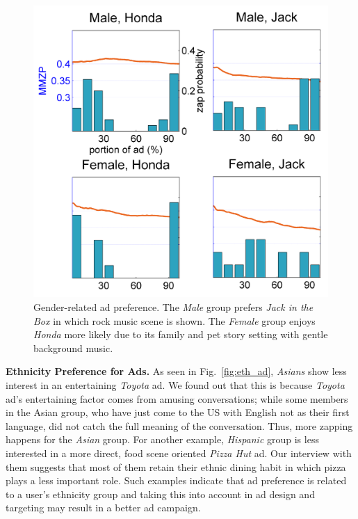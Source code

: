 \documentclass[twoside,leqno,twocolumn]{article}
\begin{document}
\begin{figure}[h]
	\centering
		\includegraphics[width=.8\columnwidth]{fig/ad_gend.png}
	\caption{Gender-related ad preference. The \textit{Male} group prefers \textit{Jack in the Box} in which rock music scene is shown. The \textit{Female} group enjoys \textit{Honda} more likely due to its family and pet story setting with gentle background music.}
	\label{fig:ad_gend}
\end{figure}

\noindent \textbf{Ethnicity Preference for Ads.} As seen in Fig.~\ref{fig:eth_ad}, \textit{Asians} show less interest in an entertaining \textit{Toyota} ad. We found out that this is because \textit{Toyota} ad's entertaining factor comes from amusing conversations; while some members in the Asian group, who have just come to the US with English not as their first language, did not catch the full meaning of the conversation. Thus, more zapping happens for the \textit{Asian} group. For another example, \textit{Hispanic} group is less interested in a more direct, food scene oriented \textit{Pizza Hut} ad. Our interview with them suggests that most of them retain their ethnic dining habit in which pizza plays a less important role. Such examples indicate that ad preference is related to a user's ethnicity group and taking this into account in ad design and targeting may result in a better ad campaign.
\end{document}
